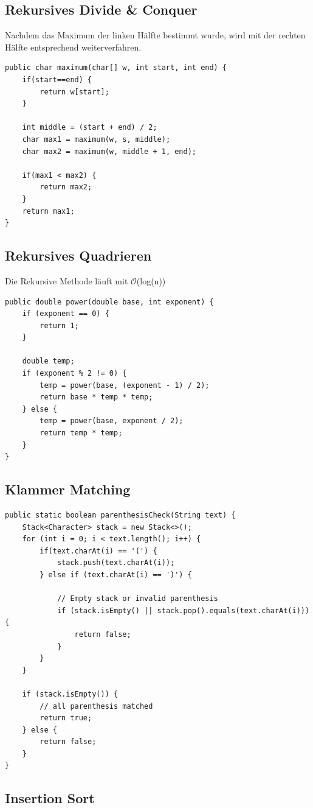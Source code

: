 \subsection{Rekursives Divide \& Conquer}
Nachdem das Maximum der linken Hälfte bestimmt wurde, wird mit der rechten Hälfte entsprechend weiterverfahren.
\begin{lstlisting}
public char maximum(char[] w, int start, int end) {
	if(start==end) {
		return w[start];
	}
	
	int middle = (start + end) / 2;
	char max1 = maximum(w, s, middle);
	char max2 = maximum(w, middle + 1, end);
	
	if(max1 < max2) {
		return max2;
	}
	return max1;
}
\end{lstlisting}

\subsection{Rekursives Quadrieren}
Die Rekursive Methode läuft mit $\mathcal{O}$(log(n))
\begin{lstlisting}
public double power(double base, int exponent) {
	if (exponent == 0) {
		return 1;
	}
	
	double temp;
	if (exponent % 2 != 0) {
		temp = power(base, (exponent - 1) / 2);
		return base * temp * temp;
	} else {
		temp = power(base, exponent / 2);
		return temp * temp;
	}
}
\end{lstlisting}


\subsection{Klammer Matching}
\begin{lstlisting}
public static boolean parenthesisCheck(String text) {
	Stack<Character> stack = new Stack<>();
	for (int i = 0; i < text.length(); i++) {
		if(text.charAt(i) == '(') {
			stack.push(text.charAt(i));
		} else if (text.charAt(i) == ')') {
	
			// Empty stack or invalid parenthesis
			if (stack.isEmpty() || stack.pop().equals(text.charAt(i))) {
				return false;
			} 
		}
	}

	if (stack.isEmpty()) {
		// all parenthesis matched
		return true;
	} else {
		return false;
	}
}
\end{lstlisting}

\subsection{Insertion Sort}

